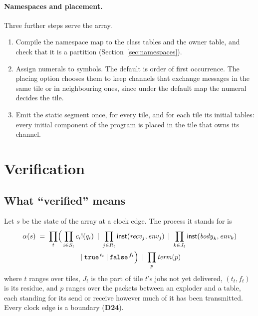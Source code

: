 \documentclass[11pt]{article}
\newcommand{\kw}[1]{\texttt{#1}}
\newcommand{\tru}{\kw{true}}
\newcommand{\fls}{\kw{false}}
\newcommand{\snd}[2]{#1!(#2)}
\newcommand{\cpar}{\mathbin{|}}
\newcommand{\dec}[1]{\textbf{D#1}}
\theoremstyle{definition}
\theoremstyle{remark}
\begin{document}
\paragraph{Namespaces and placement.} Three further steps serve the array.
\begin{enumerate}
\item Compile the namespace map to the class tables and the owner table, and
check that it is a partition (Section~\ref{sec:namespaces}).
\item Assign numerals to symbols. The default is order of first occurrence.
The placing option chooses them to keep channels that exchange messages in
the same tile or in neighbouring ones, since under the default map the
numeral decides the tile.
\item Emit the static segment once, for every tile, and for each tile its
initial tables: every initial component of the program is placed in the tile
that owns its channel.
\end{enumerate}

\section{Verification}\label{sec:verification}

\subsection{What ``verified'' means}

Let $s$ be the state of the array at a clock edge. The process it stands for
is
\begin{multline*}
\alpha(s) \;=\; \prod_{t}\Bigl(\, \prod_{i \in S_t} \snd{c_i}{q_i} \;\cpar\;
   \prod_{j \in R_t} \mathsf{inst}(\mathit{recv}_j,\mathit{env}_j) \;\cpar\;
   \prod_{k \in J_t} \mathsf{inst}(\mathit{body}_k,\mathit{env}_k)\\
   \;\cpar\; \tru^{\,t_t} \cpar \fls^{\,f_t} \Bigr) \;\cpar\; \prod_{p} \mathit{term}(p)
\end{multline*}
where $t$ ranges over tiles, $J_t$ is the part of tile $t$'s jobs not yet
delivered, $(t_t, f_t)$ is its residue, and $p$ ranges over the packets
between an exploder and a table, each standing for its send or receive
however much of it has been transmitted. Every clock edge is a boundary
(\dec{24}).
\end{document}
